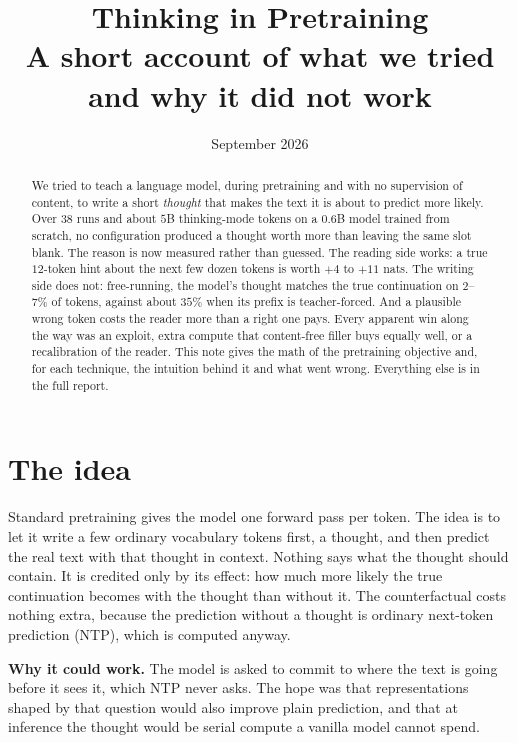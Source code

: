 \documentclass[11pt]{article}
\title{Thinking in Pretraining\\[4pt]
\large A short account of what we tried and why it did not work}
\author{}
\date{September 2026}
\begin{document}
\maketitle

\begin{abstract}
We tried to teach a language model, during pretraining and with no supervision of content, to write a short \emph{thought} that makes the text it is about to predict more likely. Over 38 runs and about $5$B thinking-mode tokens on a $0.6$B model trained from scratch, no configuration produced a thought worth more than leaving the same slot blank. The reason is now measured rather than guessed. The reading side works: a true $12$-token hint about the next few dozen tokens is worth $+4$ to $+11$ nats. The writing side does not: free-running, the model's thought matches the true continuation on $2$--$7\%$ of tokens, against about $35\%$ when its prefix is teacher-forced. And a plausible wrong token costs the reader more than a right one pays. Every apparent win along the way was an exploit, extra compute that content-free filler buys equally well, or a recalibration of the reader. This note gives the math of the pretraining objective and, for each technique, the intuition behind it and what went wrong. Everything else is in the full report.
\end{abstract}

\section{The idea}

Standard pretraining gives the model one forward pass per token. The idea is to let it write a few ordinary vocabulary tokens first, a thought, and then predict the real text with that thought in context. Nothing says what the thought should contain. It is credited only by its effect: how much more likely the true continuation becomes with the thought than without it. The counterfactual costs nothing extra, because the prediction without a thought is ordinary next-token prediction (NTP), which is computed anyway.

\textbf{Why it could work.} The model is asked to commit to where the text is going before it sees it, which NTP never asks. The hope was that representations shaped by that question would also improve plain prediction, and that at inference the thought would be serial compute a vanilla model cannot spend.
\end{document}
